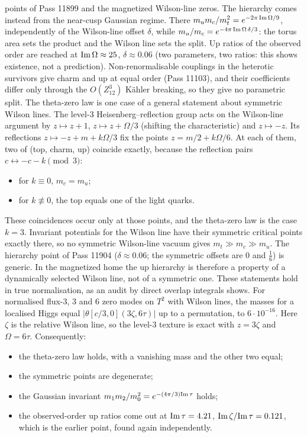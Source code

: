 points of Pass 11899 and the magnetized Wilson-line zeros. The hierarchy comes instead from the near-cusp Gaussian
regime. There $m_um_c/m_t^2=e^{-2\pi\,{\rm Im}\,\Omega/9}$, independently of the Wilson-line offset $\delta$, while
$m_u/m_c=e^{-4\pi\,{\rm Im}\,\Omega\,\delta/3}$: the torus area sets the product and the Wilson line sets the split.
Up ratios of the observed order are reached at ${\rm Im}\,\Omega\approx25$, $\delta\approx0.06$ (two parameters, two
ratios: this shows existence, not a prediction). Non-renormalisable couplings in the heterotic survivors give charm and
up at equal order (Pass 11103), and their coefficients differ only through the $O(Z_{12}^3)$ K\"ahler breaking, so they
give no parametric split. 
The theta-zero law is one case of a general statement about symmetric Wilson lines. The level-3 Heisenberg--reflection
group acts on the Wilson-line argument by $z\mapsto z+1$, $z\mapsto z+\Omega/3$ (shifting the characteristic) and
$z\mapsto -z$. Its reflections $z\mapsto -z+m+k\Omega/3$ fix the points $z=m/2+k\Omega/6$. At each of them, two of
(top, charm, up) coincide exactly, because the reflection pairs $c\leftrightarrow -c-k \pmod 3$:
\begin{itemize}
\item for $k\equiv0$, $m_c=m_u$;
\item for $k\not\equiv0$, the top equals one of the light quarks.
\end{itemize}
These coincidences occur only at those points, and the theta-zero law is the case $k=3$. Invariant potentials for the
Wilson line have their symmetric critical points exactly there, so no symmetric Wilson-line vacuum gives
$m_t\gg m_c\gg m_u$. The hierarchy point of Pass 11904 ($\delta\approx0.06$; the symmetric offsets are $0$ and $\tfrac16$)
is generic. In the magnetized home the up hierarchy is therefore a property of a dynamically selected Wilson line, not
of a symmetric one. 
These statements hold in true normalisation, as an audit by direct overlap integrals shows. For normalised flux-3, 3
and 6 zero modes on $T^2$ with Wilson lines, the masses for a localised Higgs equal $|\theta[c/3,0](3\zeta,6\tau)|$ up
to a permutation, to $6\cdot10^{-16}$. Here $\zeta$ is the relative Wilson line, so the level-3 texture is exact with
$z=3\zeta$ and $\Omega=6\tau$. Consequently:
\begin{itemize}
\item the theta-zero law holds, with a vanishing mass and the other two equal;
\item the symmetric points are degenerate;
\item the Gaussian invariant $m_1m_2/m_0^2=e^{-(4\pi/3){\rm Im}\,\tau}$ holds;
\item the observed-order up ratios come out at ${\rm Im}\,\tau=4.21$, ${\rm Im}\,\zeta/{\rm Im}\,\tau=0.121$, which is
the earlier point, found again independently.
\end{itemize}

